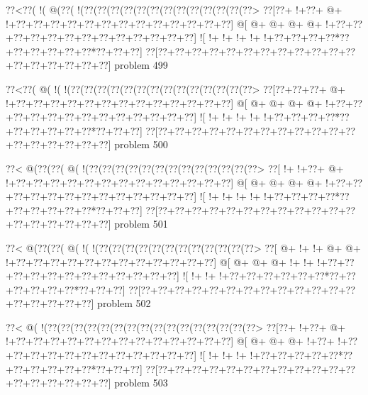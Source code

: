 \vbox{\vbox{\goo
\0??<\0??(\- !(\- @(\0??(\- !(\0??(\0??(\0??(\0??(\0??(\0??(\0??(\0??(\0??(\0??(\0??(\0??(\0??>
\0??[\0??+\- !+\0??+\- @+\- !+\0??+\0??+\0??+\0??+\0??+\0??+\0??+\0??+\0??+\0??+\0??+\0??+\0??]
\- @[\- @+\- @+\- @+\- @+\- !+\0??+\0??+\0??+\0??+\0??+\0??+\0??+\0??+\0??+\0??+\0??+\0??+\0??]
\- ![\- !+\- !+\- !+\- !+\- !+\0??+\0??+\0??+\0??*\0??+\0??+\0??+\0??+\0??+\0??*\0??+\0??+\0??]
\0??[\0??+\0??+\0??+\0??+\0??+\0??+\0??+\0??+\0??+\0??+\0??+\0??+\0??+\0??+\0??+\0??+\0??+\0??]
}
\hfil problem 499\hfil\break
}



\vbox{\vbox{\goo
\0??<\0??(\- @(\- !(\- !(\0??(\0??(\0??(\0??(\0??(\0??(\0??(\0??(\0??(\0??(\0??(\0??(\0??(\0??>
\0??[\0??+\0??+\0??+\- @+\- !+\0??+\0??+\0??+\0??+\0??+\0??+\0??+\0??+\0??+\0??+\0??+\0??+\0??]
\- @[\- @+\- @+\- @+\- @+\- !+\0??+\0??+\0??+\0??+\0??+\0??+\0??+\0??+\0??+\0??+\0??+\0??+\0??]
\- ![\- !+\- !+\- !+\- !+\- !+\0??+\0??+\0??+\0??*\0??+\0??+\0??+\0??+\0??+\0??*\0??+\0??+\0??]
\0??[\0??+\0??+\0??+\0??+\0??+\0??+\0??+\0??+\0??+\0??+\0??+\0??+\0??+\0??+\0??+\0??+\0??+\0??]
}
\hfil problem 500\hfil\break
}



\vbox{\vbox{\goo
\0??<\- @(\0??(\0??(\- @(\- !(\0??(\0??(\0??(\0??(\0??(\0??(\0??(\0??(\0??(\0??(\0??(\0??(\0??>
\0??[\- !+\- !+\0??+\- @+\- !+\0??+\0??+\0??+\0??+\0??+\0??+\0??+\0??+\0??+\0??+\0??+\0??+\0??]
\- @[\- @+\- @+\- @+\- @+\- !+\0??+\0??+\0??+\0??+\0??+\0??+\0??+\0??+\0??+\0??+\0??+\0??+\0??]
\- ![\- !+\- !+\- !+\- !+\- !+\0??+\0??+\0??+\0??*\0??+\0??+\0??+\0??+\0??+\0??*\0??+\0??+\0??]
\0??[\0??+\0??+\0??+\0??+\0??+\0??+\0??+\0??+\0??+\0??+\0??+\0??+\0??+\0??+\0??+\0??+\0??+\0??]
}
\hfil problem 501\hfil\break
}



\vbox{\vbox{\goo
\0??<\- @(\0??(\0??(\- @(\- !(\- !(\0??(\0??(\0??(\0??(\0??(\0??(\0??(\0??(\0??(\0??(\0??(\0??>
\0??[\- @+\- !+\- !+\- @+\- @+\- !+\0??+\0??+\0??+\0??+\0??+\0??+\0??+\0??+\0??+\0??+\0??+\0??]
\- @[\- @+\- @+\- @+\- !+\- !+\- !+\0??+\0??+\0??+\0??+\0??+\0??+\0??+\0??+\0??+\0??+\0??+\0??]
\- ![\- !+\- !+\- !+\0??+\0??+\0??+\0??+\0??+\0??*\0??+\0??+\0??+\0??+\0??+\0??*\0??+\0??+\0??]
\0??[\0??+\0??+\0??+\0??+\0??+\0??+\0??+\0??+\0??+\0??+\0??+\0??+\0??+\0??+\0??+\0??+\0??+\0??]
}
\hfil problem 502\hfil\break
}



\vbox{\vbox{\goo
\0??<\- @(\- !(\0??(\0??(\0??(\0??(\0??(\0??(\0??(\0??(\0??(\0??(\0??(\0??(\0??(\0??(\0??(\0??>
\0??[\0??+\- !+\0??+\- @+\- !+\0??+\0??+\0??+\0??+\0??+\0??+\0??+\0??+\0??+\0??+\0??+\0??+\0??]
\- @[\- @+\- @+\- @+\- !+\0??+\- !+\0??+\0??+\0??+\0??+\0??+\0??+\0??+\0??+\0??+\0??+\0??+\0??]
\- ![\- !+\- !+\- !+\- !+\0??+\0??+\0??+\0??+\0??*\0??+\0??+\0??+\0??+\0??+\0??*\0??+\0??+\0??]
\0??[\0??+\0??+\0??+\0??+\0??+\0??+\0??+\0??+\0??+\0??+\0??+\0??+\0??+\0??+\0??+\0??+\0??+\0??]
}
\hfil problem 503\hfil\break
}



